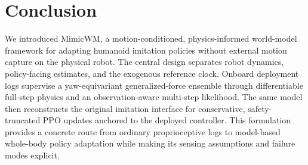 \documentclass[10pt,twocolumn]{article}
\newcommand{\method}{MimicWM}
\begin{document}
\section{Conclusion}
\label{sec:conclusion}

We introduced \method{}, a motion-conditioned, physics-informed world-model framework for adapting humanoid imitation policies without external motion capture on the physical robot. The central design separates robot dynamics, policy-facing estimates, and the exogenous reference clock. Onboard deployment logs supervise a yaw-equivariant generalized-force ensemble through differentiable full-step physics and an observation-aware multi-step likelihood. The same model then reconstructs the original imitation interface for conservative, safety-truncated PPO updates anchored to the deployed controller. This formulation provides a concrete route from ordinary proprioceptive logs to model-based whole-body policy adaptation while making its sensing assumptions and failure modes explicit.

\balance


\end{document}
